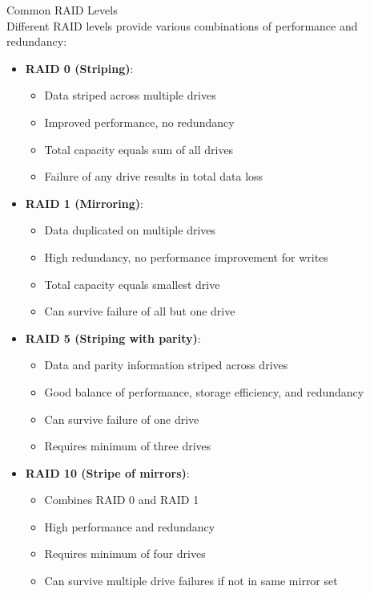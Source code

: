 \begin{definition}{Common RAID Levels}\\
    Different RAID levels provide various combinations of performance and redundancy:
    \begin{itemize}
        \item \textbf{RAID 0 (Striping)}:
            \begin{itemize}
                \item Data striped across multiple drives
                \item Improved performance, no redundancy
                \item Total capacity equals sum of all drives
                \item Failure of any drive results in total data loss
            \end{itemize}
        \item \textbf{RAID 1 (Mirroring)}:
            \begin{itemize}
                \item Data duplicated on multiple drives
                \item High redundancy, no performance improvement for writes
                \item Total capacity equals smallest drive
                \item Can survive failure of all but one drive
            \end{itemize}
        \item \textbf{RAID 5 (Striping with parity)}:
            \begin{itemize}
                \item Data and parity information striped across drives
                \item Good balance of performance, storage efficiency, and redundancy
                \item Can survive failure of one drive
                \item Requires minimum of three drives
            \end{itemize}
        \item \textbf{RAID 10 (Stripe of mirrors)}:
            \begin{itemize}
                \item Combines RAID 0 and RAID 1
                \item High performance and redundancy
                \item Requires minimum of four drives
                \item Can survive multiple drive failures if not in same mirror set
            \end{itemize}
    \end{itemize}
\end{definition}

